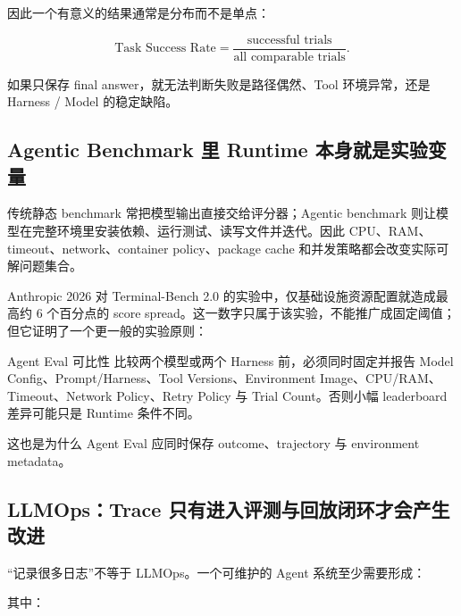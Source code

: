 \documentclass[profile=standard,twoside=false]{ipara-handbook}
\begin{document}
因此一个有意义的结果通常是分布而不是单点：

$$
\text{Task Success Rate}
=\frac{\text{successful trials}}{\text{all comparable trials}}.
$$

如果只保存 final answer，就无法判断失败是路径偶然、Tool 环境异常，还是 Harness / Model 的稳定缺陷。

\subsection{Agentic Benchmark 里 Runtime 本身就是实验变量}

传统静态 benchmark 常把模型输出直接交给评分器；Agentic benchmark 则让模型在完整环境里安装依赖、运行测试、读写文件并迭代。因此 CPU、RAM、timeout、network、container policy、package cache 和并发策略都会改变实际可解问题集合。

Anthropic 2026 对 Terminal-Bench 2.0 的实验中，仅基础设施资源配置就造成最高约 6 个百分点的 score spread。这一数字只属于该实验，不能推广成固定阈值；但它证明了一个更一般的实验原则：

\begin{criterion}{Agent Eval 可比性}
比较两个模型或两个 Harness 前，必须同时固定并报告 Model Config、Prompt/Harness、Tool Versions、Environment Image、CPU/RAM、Timeout、Network Policy、Retry Policy 与 Trial Count。否则小幅 leaderboard 差异可能只是 Runtime 条件不同。
\end{criterion}

这也是为什么 Agent Eval 应同时保存 outcome、trajectory 与 environment metadata。

\subsection{LLMOps：Trace 只有进入评测与回放闭环才会产生改进}

“记录很多日志”不等于 LLMOps。一个可维护的 Agent 系统至少需要形成：

\begin{processchain}
\end{processchain}

其中：
\end{document}

